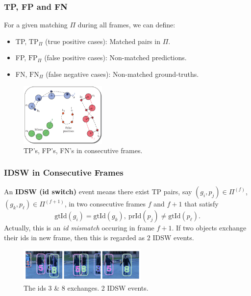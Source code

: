 \documentclass[slidestop, mathserif]{beamer}
\begin{document}
\begin{frame}
    \frametitle{TP, FP and FN}

    For a given matching $\Pi$ during all frames, we can define:
    \begin{itemize} \itemsep = 2pt
    \item TP, $\text{TP}_\Pi$ (true positive cases): Matched pairs in $\Pi$.
    \item FP, $\text{FP}_\Pi$ (false positive cases): Non-matched predictions.
    \item FN, $\text{FN}_\Pi$ (false negative cases): Non-matched ground-truths.
    \end{itemize}

    \begin{figure}
        \includegraphics[width=120pt]{pics/fig2.png}
        \caption{TP's, FP's, FN's in consecutive frames.}
    \end{figure}

\end{frame}

\begin{frame}
    \frametitle{IDSW in Consecutive Frames}

    An {\bf IDSW (id switch)} event means there exist TP pairs, say $(g_i, p_j)\in\Pi^{(f)}$,
    $(g_k, p_\ell)\in\Pi^{(f+1)}$, in two consecutive frames
    $f$ and $f+1$ that satisfy
    \[
        \text{gtId}(g_i) = \text{gtId}(g_k),\ 
        \text{prId}(p_j) \neq \text{gtId}(p_\ell).
    \]
    Actually, this is an \emph{id mismatch} occuring in frame $f+1$.
    If two objects exchange their ids in new frame, then this is regarded as $2$
    IDSW events.
    \begin{figure}
        \includegraphics[width=180pt]{pics/fig3.png}
        \caption{The ids 3 \& 8 exchanges. 2 IDSW events.}
    \end{figure}
    
    
\end{frame}
\end{document}
